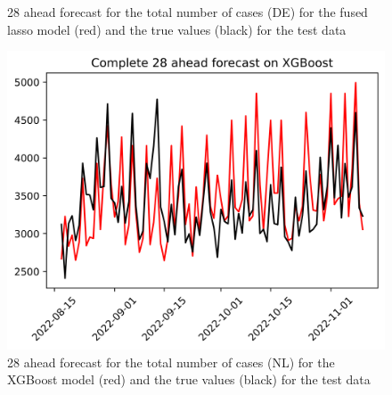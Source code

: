 \begin{figure}
\begin{minipage}{.32\textwidth}
  \caption{28 ahead forecast for the total number of cases (DE) for the fused lasso model (red) and the true values (black) for the test data}
  \label{fig:tot_cases_fc_28_flasso_DE}
\end{minipage}
\begin{minipage}{.32\textwidth}
  \centering
  \includegraphics[width=\linewidth]{pics/28_ah/Complete_28_ahead_XGBoost.png}
  \caption{28 ahead forecast for the total number of cases (NL) for the XGBoost model (red) and the true values (black) for the test data}
  \label{fig:tot_cases_fc_28_xgb}
\end{minipage}

\end{figure}
